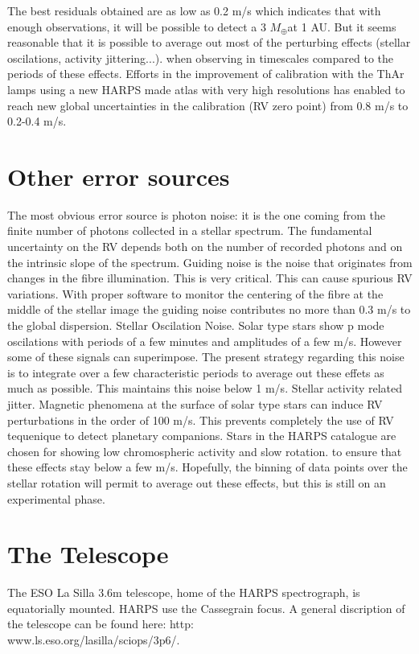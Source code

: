 \documentclass[dvips,12pt,a4paper]{report}
\begin{document}
{{The best residuals obtained are as low as 0.2 m/s which indicates that with enough observations, it will be possible to detect a 3 $M_\oplus$at 1 AU. But it seems reasonable that it is possible to average out most of the perturbing effects (stellar oscilations, activity jittering...). when observing in timescales compared to the periods of these effects. 
Efforts in the improvement of calibration with the ThAr lamps using a new HARPS made atlas with very high resolutions has enabled to reach new global uncertainties in the calibration  (RV zero point) from 0.8 m/s to 0.2-0.4 m/s. 

\section{Other error sources}

The most obvious error source is photon noise: it is the one coming from the finite number of photons collected in a stellar spectrum. The fundamental uncertainty on the RV depends both on the number of recorded photons and on the intrinsic slope of the spectrum. 
Guiding noise is the noise that originates from changes in the fibre illumination. This is very critical. This can cause spurious RV variations. With proper software to monitor the centering of the fibre at the middle of the stellar image the guiding noise contributes no more than 0.3 m/s to the global dispersion.
Stellar Oscilation Noise. Solar type stars show p mode oscilations with periods of a few minutes and amplitudes of a few m/s. However some of these signals can superimpose. The present strategy regarding this noise is to integrate over a few characteristic periods to average out these effets as much as possible. This maintains this noise below 1 m/s.
Stellar activity related jitter. Magnetic phenomena at the surface of solar type stars can induce RV perturbations in the order of 100 m/s. This prevents completely the use of RV tequenique to detect planetary companions. Stars in the HARPS catalogue are chosen for showing low chromospheric activity and slow rotation. to ensure that these effects stay below a few m/s. Hopefully, the binning of data points over the stellar rotation will permit to average out these effects, but this is still on an experimental phase.






\section{The Telescope}
The ESO La Silla 3.6m telescope, home of the HARPS spectrograph, is equatorially mounted. HARPS use the Cassegrain focus. A general discription of the telescope can be found here: http:\\www.ls.eso.org/lasilla/sciops/3p6/. 

}}
\end{document}
